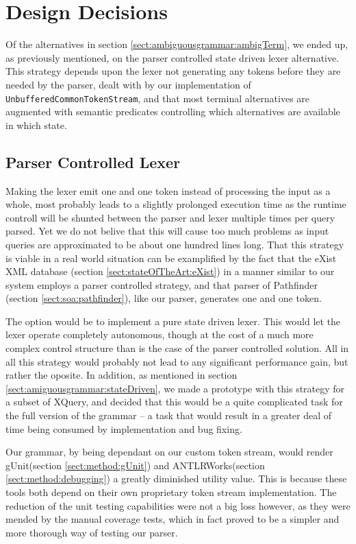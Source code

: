 \section{Design Decisions}
\label{sect:discussion:designDecisions}

Of the alternatives in section \ref{sect:ambiguousgrammar:ambigTerm}, we ended up, as previously mentioned, on the parser controlled state driven lexer alternative. This strategy depends upon the lexer not generating any tokens before they are needed by the parser, dealt with by our implementation of \verb!UnbufferedCommonTokenStream!, and that most terminal alternatives are augmented with semantic predicates controlling which alternatives are available in which state.

\subsection{Parser Controlled Lexer}
Making the lexer emit one and one token instead of processing the input as a
whole, most probably leads to a slightly prolonged execution time as the
runtime controll will be shunted between the parser and lexer multiple times
per query parsed. Yet we do not belive that this will cause too much problems
as input queries are approximated to be about one hundred lines long. That this
strategy is viable in a real world situation can be examplified by the fact
that the eXist XML database (section \ref{sect:stateOfTheArt:eXist}) in a
manner similar to our system employs a parser controlled strategy, and that
parser of Pathfinder (section \ref{sect:soa:pathfinder}), like our parser,
generates one and one token.        

The option would be to implement a pure state driven lexer. This would let the
lexer operate completely autonomous, though at the cost of a much more complex
control structure than is the case of the parser controlled solution. All in
all this strategy would probably not lead to any significant performance gain,
but rather the oposite. In addition, as mentioned in section
\ref{sect:amiguousgrammar:stateDriven}, we made a prototype with this strategy
for a subset of XQuery, and decided that this would be a quite complicated task
for the full version of the grammar -- a task that would result in a greater
deal of time being consumed by implementation and bug fixing.

Our grammar, by being dependant on our custom token stream, would render
gUnit(section \ref{sect:method:gUnit}) and ANTLRWorks(section
\ref{sect:method:debugging}) a greatly diminished utility value. This is
because these tools both depend on their own proprietary token stream
implementation. The reduction of the unit testing capabilities were not a big
loss however, as they were mended by the manual coverage tests, which in fact
proved to be a simpler and more thorough way of testing our parser.

